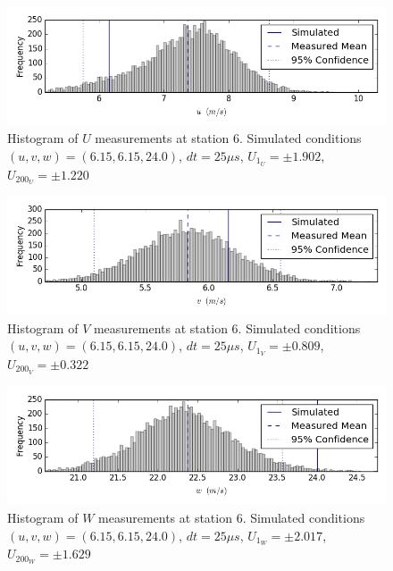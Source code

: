\begin{figure}[H]
\centering
\includegraphics[width=6in]{figs/Ely_May28th06001/uncertainty_Ely_May28th06001_U}
\caption{Histogram of $U$ measurements at station 6. Simulated conditions $(u,v,w)=(6.15, 6.15, 24.0)$, $dt=25 \mu s$, $U_1_U=\pm 1.902$, $U_200_U=\pm 1.220$}
\label{fig:uncertainty_Ely_May28th06001_U}
\end{figure}


\begin{figure}[H]
\centering
\includegraphics[width=6in]{figs/Ely_May28th06001/uncertainty_Ely_May28th06001_V}
\caption{Histogram of $V$ measurements at station 6. Simulated conditions $(u,v,w)=(6.15, 6.15, 24.0)$, $dt=25 \mu s$, $U_1_V=\pm 0.809$, $U_200_V=\pm 0.322$}
\label{fig:uncertainty_Ely_May28th06001_V}
\end{figure}


\begin{figure}[H]
\centering
\includegraphics[width=6in]{figs/Ely_May28th06001/uncertainty_Ely_May28th06001_W}
\caption{Histogram of $W$ measurements at station 6. Simulated conditions $(u,v,w)=(6.15, 6.15, 24.0)$, $dt=25 \mu s$, $U_1_W=\pm 2.017$, $U_200_W=\pm 1.629$}
\label{fig:uncertainty_Ely_May28th06001_W}
\end{figure}


